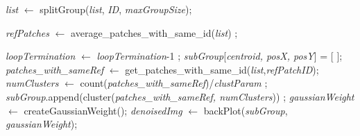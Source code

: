\documentclass[fleqn,10pt]{wlscirep}
\begin{document}
\begin{algorithm}
\begin{algorithmic}[1]
				
				\State \textit{list} $\gets$ splitGroup(\textit{list}, \textit{ID}, \textit{maxGroupSize});
				
				
				\EndIf
				
				\EndFor
				
				\State \textit{refPatches} $\gets$ average\_patches\_with\_same\_id(\textit{list}) ;
				
				\State \textit{loopTermination} $\gets$ \textit{loopTermination}-1 ;
				\EndFor
				\State \textit{subGroup}[\textit{centroid, posX, posY}] = [ ];
				\State \textit{patches\_with\_sameRef} $\gets$ get\_patches\_with\_same\_id(\textit{list},\textit{refPatchID});
				\State \textit{numClusters} $\gets$ count(\textit{patches\_with\_sameRef})/\textit{clustParam} ;
				\State \textit{subGroup}.append(cluster(\textit{patches\_with\_sameRef, numClusters})) ;
				\EndFor
				\State \textit{gaussianWeight} $\gets$ createGaussianWeight();
				\State \textit{denoisedImg} $\gets$ backPlot(\textit{subGroup}, \textit{gaussianWeight});
			\end{algorithmic}
		\end{algorithm}
		
		\clearpage
		
		
	
\end{document}
